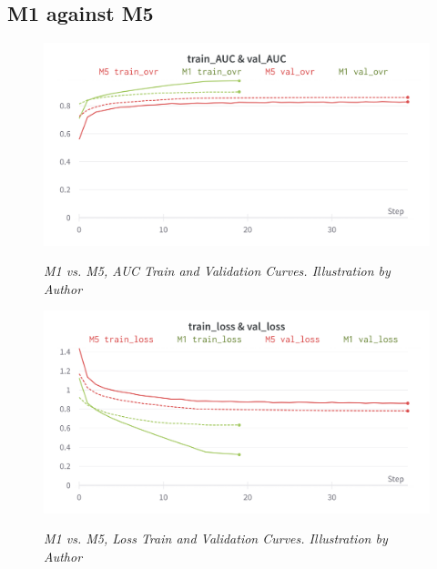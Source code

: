 \newpage


\subsection{M1 against M5}

\begin{figure}[H]
\centering
    \includegraphics[width=\textwidth]{imatges/results/AUCM1M5.png}
\caption[M1 vs. M5, AUC Train and Validation Curves]{\textit{M1 vs. M5, AUC Train and Validation Curves. Illustration by Author}}
{\label{fig:aucm0m4}}
\end{figure}


\begin{figure}[H]
\centering
    \includegraphics[width=\textwidth]{imatges/results/LossM1M5.png}
\caption[M1 vs. M5, Loss Train and Validation Curves]{\textit{M1 vs. M5, Loss Train and Validation Curves. Illustration by Author}}
{\label{fig:lossm0m4}}
\end{figure}

\newpage

